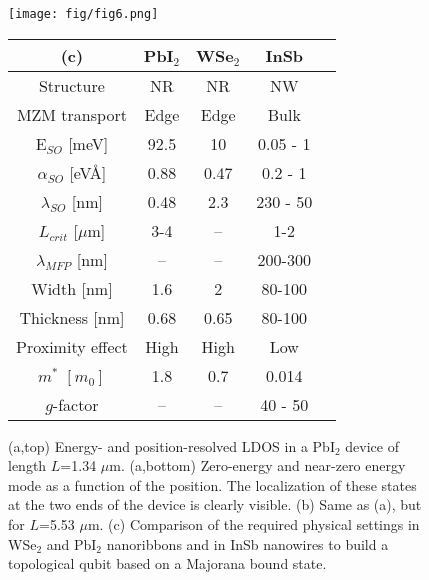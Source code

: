 \documentclass[10pt,usletter,conference]{IEEEtran}
\begin{document}
\begin{figure*}
\begin{minipage}{0.58\linewidth}
\centering
\texttt{[image: fig/fig6.png]}
\end{minipage}
\hspace{0.1cm}
\begin{minipage}[b]{0.33\linewidth}
\begin{tabular}{|c|c|c|c|c|}
\hline
(c)&PbI$_2$&WSe$_2$&InSb \cite{MajoranaReview}\\
\hline
Structure & NR & NR & NW\\
MZM transport & Edge & Edge & Bulk\\
E$_{SO}$ [meV]&92.5&10&0.05 - 1\\
$\alpha_{SO}$ [eV\AA]&0.88&0.47&0.2 - 1\\
$\lambda_{SO}$ [nm]& 0.48 & 2.3 &230 - 50\\
$L_{crit}$ [$\mu$m]& 3-4 & -- & 1-2\\
$\lambda_{MFP}$ [nm]& --  & -- & 200-300\\
Width [nm] & 1.6 & 2 & 80-100\\
Thickness [nm] & 0.68 & 0.65 & 80-100\\
Proximity effect & High & High & Low\\
$m^{*}$ $[m_0]$&1.8&0.7&0.014\\
$g$-factor& -- & -- &40 - 50\\
\hline
\end{tabular}
\end{minipage}
\caption{(a,top) Energy- and position-resolved LDOS in a PbI$_2$ device
  of length $L$=1.34 $\mu$m. (a,bottom) Zero-energy and
  near-zero energy mode as a function of the position. The
  localization of these states at the two ends of the device is
  clearly visible. (b) Same as (a), but for $L$=5.53 $\mu$m. (c)
  Comparison of the required physical settings in WSe$_2$ and PbI$_2$
  nanoribbons and in InSb nanowires to build a topological qubit based
  on a Majorana bound state.} 
\label{fig:6}
\end{figure*}
\end{document}
